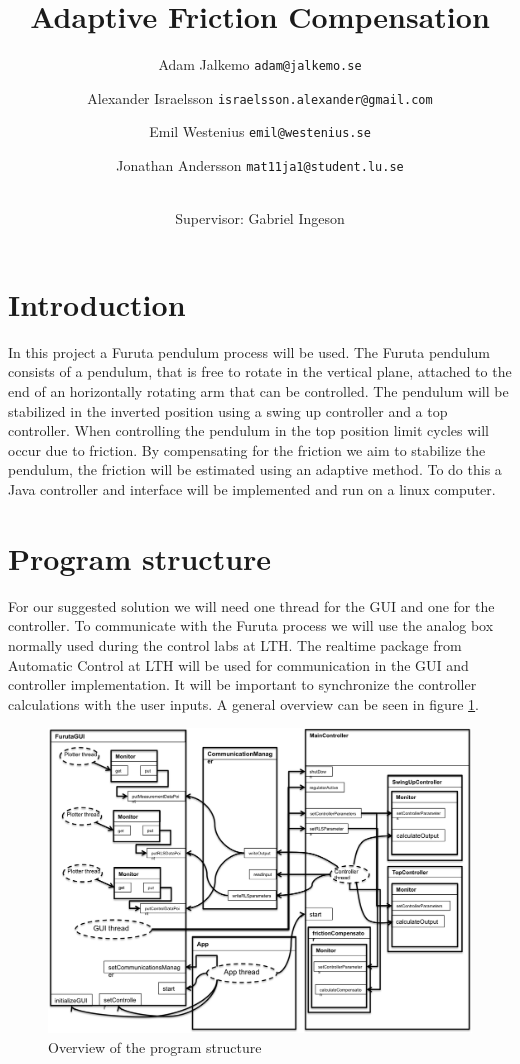 \documentclass[10pt,a4paper]{article}
\author{Adam Jalkemo \texttt{adam@jalkemo.se} \and
Alexander Israelsson \texttt{israelsson.alexander@gmail.com} \and
Emil Westenius \texttt{emil@westenius.se} \and
Jonathan Andersson \texttt{mat11ja1@student.lu.se}
\and 
\\
Supervisor: Gabriel Ingeson}
\begin{document}
\title{Adaptive Friction Compensation}

\maketitle
\pagebreak
\section{Introduction}
In this project a Furuta pendulum process will be used. The Furuta pendulum consists of a pendulum, that is free to rotate in the vertical plane, attached to the end of an horizontally rotating arm that can be controlled. The pendulum will be stabilized in the inverted position using a swing up controller and a top controller. When controlling the pendulum in the top position limit cycles will occur due to friction. By compensating for the friction we aim to stabilize the pendulum, the friction will be estimated using an adaptive method. To do this a Java controller and interface will be implemented and run on a linux computer.
\section{Program structure}
For our suggested solution we will need one thread for the GUI and one for the controller. To communicate with the Furuta process we will use the analog box normally used during the control labs at LTH. The realtime package from Automatic Control at LTH will be used for communication in the GUI and controller implementation. It will be important to synchronize the controller calculations with the user inputs. A general overview can be seen in figure \ref{fig:uml}.

\begin{figure}[!htb]
\centering
\includegraphics[width=1\textwidth]{notUml.png}
\caption{Overview of the program structure}
\label{fig:uml}
\end{figure}
\end{document}
